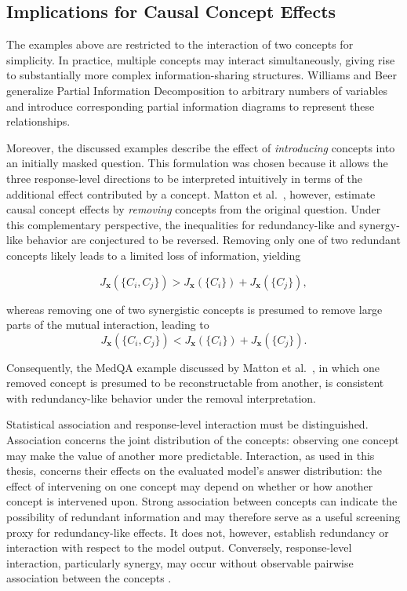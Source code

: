 \subsection{Implications for Causal Concept Effects}
The examples above are restricted to the interaction of two concepts for simplicity. In practice, multiple concepts may interact simultaneously, giving rise to substantially more complex information-sharing structures. Williams and Beer \cite{williamsNonnegativeDecompositionMultivariate2010} generalize Partial Information Decomposition to arbitrary numbers of variables and introduce corresponding partial information diagrams to represent these relationships.

Moreover, the discussed examples describe the effect of \emph{introducing} concepts into an initially masked question. This formulation was chosen because it allows the three response-level directions to be interpreted intuitively in terms of the additional effect contributed by a concept. Matton et al.~\cite{mattonWalkTalkMeasuring2024}, however, estimate causal concept effects by \emph{removing} concepts from the original question. Under this complementary perspective, the inequalities for redundancy-like and synergy-like behavior are conjectured to be reversed. Removing only one of two redundant concepts likely leads to a limited loss of information, yielding

\begin{equation}
	J_{\mathbf{x}}(\{C_i,C_j\})
	>
	J_{\mathbf{x}}(\{C_i\})+J_{\mathbf{x}}(\{C_j\}),
\end{equation}

whereas removing one of two synergistic concepts is presumed to remove large parts of the mutual interaction, leading to
\begin{equation}
	J_{\mathbf{x}}(\{C_i,C_j\})
	<
	J_{\mathbf{x}}(\{C_i\})+J_{\mathbf{x}}(\{C_j\}).
\end{equation}

Consequently, the MedQA example discussed by Matton et al.~\cite{mattonWalkTalkMeasuring2024}, in which one removed concept is presumed to be reconstructable from another, is consistent with redundancy-like behavior under the removal interpretation.

Statistical association and response-level interaction must be distinguished. Association concerns the joint distribution of the concepts: observing one concept may make the value of another more predictable. Interaction, as used in this thesis, concerns their effects on the evaluated model's answer distribution: the effect of intervening on one concept may depend on whether or how another concept is intervened upon. Strong association between concepts can indicate the possibility of redundant information and may therefore serve as a useful screening proxy for redundancy-like effects. It does not, however, establish redundancy or interaction with respect to the model output. Conversely, response-level interaction, particularly synergy, may occur without observable pairwise association between the concepts \cite{picaInvariantComponentsSynergy2017}.


